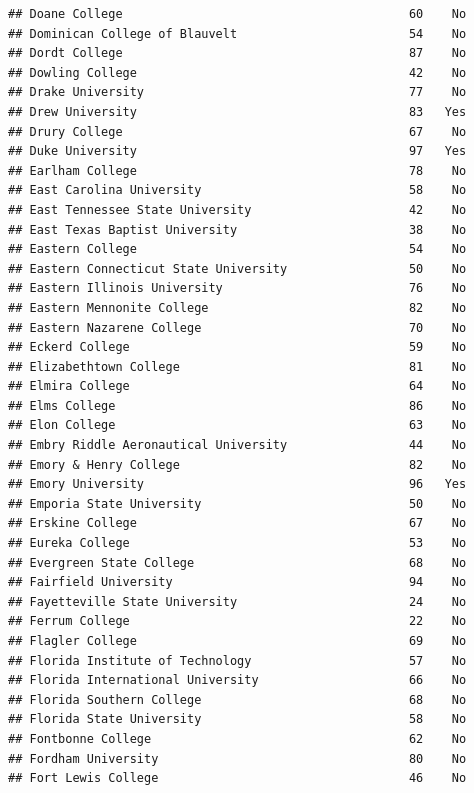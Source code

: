 \documentclass[
]{article}
\begin{document}
\begin{verbatim}
## Doane College                                        60    No
## Dominican College of Blauvelt                        54    No
## Dordt College                                        87    No
## Dowling College                                      42    No
## Drake University                                     77    No
## Drew University                                      83   Yes
## Drury College                                        67    No
## Duke University                                      97   Yes
## Earlham College                                      78    No
## East Carolina University                             58    No
## East Tennessee State University                      42    No
## East Texas Baptist University                        38    No
## Eastern College                                      54    No
## Eastern Connecticut State University                 50    No
## Eastern Illinois University                          76    No
## Eastern Mennonite College                            82    No
## Eastern Nazarene College                             70    No
## Eckerd College                                       59    No
## Elizabethtown College                                81    No
## Elmira College                                       64    No
## Elms College                                         86    No
## Elon College                                         63    No
## Embry Riddle Aeronautical University                 44    No
## Emory & Henry College                                82    No
## Emory University                                     96   Yes
## Emporia State University                             50    No
## Erskine College                                      67    No
## Eureka College                                       53    No
## Evergreen State College                              68    No
## Fairfield University                                 94    No
## Fayetteville State University                        24    No
## Ferrum College                                       22    No
## Flagler College                                      69    No
## Florida Institute of Technology                      57    No
## Florida International University                     66    No
## Florida Southern College                             68    No
## Florida State University                             58    No
## Fontbonne College                                    62    No
## Fordham University                                   80    No
## Fort Lewis College                                   46    No

\end{verbatim}
\end{document}
